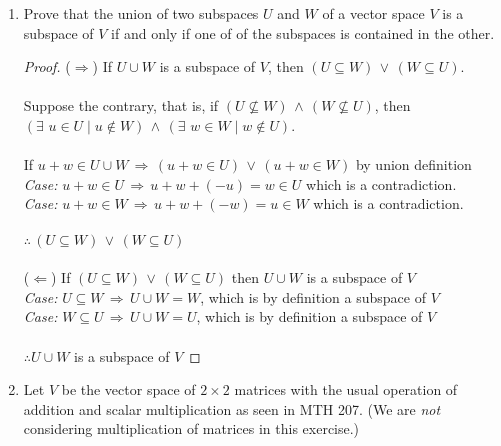 \documentclass[12pt]{article}
\newcommand{\pars}[1]{\left( {#1} \right) }
\newcommand{\OR}{\,\lor\,}
\newcommand{\AND}{\,\land\,}
\newcommand{\then}{\,\Rightarrow\,}
\begin{document}
\begin{enumerate}
\item  Prove that the union of two subspaces  $U$ and $W$ of a vector space $V$ is a subspace of $V$ if and only if one of of the subspaces is contained in the other.
        \begin{mybox}
            \begin{proof}
                ($\Longrightarrow$) If $U \cup W$ is a subspace of $V$, then $\pars{U \subseteq W} \OR \pars{W \subseteq U}$.\\
                \\Suppose the contrary, that is, if $\pars{U \not \subseteq W} \AND \pars{W \not\subseteq U}$, then\\ $\pars{\exists \,\, u \in U \mid u \not\in W} \AND \pars{\exists \,\, w \in W \mid w \not\in U}$.\\
                \\If $u + w \in U \cup W \, \Rightarrow \, \pars{u + w \in U} \OR \pars{u + w \in W}$ by union definition\vspace{0.1in}\\
                \textit{Case:} $u + w \in U \then u + w + (-u) = w \in U$ which is a contradiction.
                \\\textit{Case:} $u + w \in W \then u + w + (-w) = u \in W$ which is a contradiction.
                \\\\$\therefore \, \pars{U \subseteq W} \OR \pars{W \subseteq U}$\\
                \vspace{0.25in}\\
                ($\Longleftarrow$) If $\pars{U \subseteq W} \OR \pars{W \subseteq U}$ then $U \cup W$ is a subspace of $V$ \vspace{0.1in}\\
                \textit{Case:} $U \subseteq W \then U \cup W = W$, which is by definition a subspace of $V$\\
                \textit{Case:} $W \subseteq U \then U \cup W = U$, which is by definition a subspace of $V$\\\\
                $\therefore U \cup W$ is a subspace of $V$
            \end{proof}
        \end{mybox}
\newpage
\item Let $V$ be the vector space of $2 \times 2$ matrices with the usual operation of addition and scalar multiplication as seen in MTH 207.  (We are \emph{not} considering multiplication of matrices in this exercise.)\\

\end{enumerate}
\end{document}
